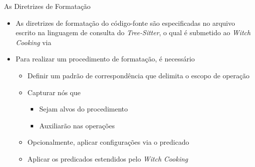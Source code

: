 \documentclass
  [ aspectratio=169,
    english,
    hyperref={citecolor=blue,colorlinks=true,linkcolor=blue,urlcolor=blue},
    brazil]
  {beamer}
\newcommand{\treesitter}{\textit{Tree-Sitter}\xspace}
\newcommand{\witchcooking}{\textit{Witch Cooking}\xspace}
\begin{document}


  \begin{frame}[fragile]{As Diretrizes de Formatação}
    \begin{itemize}
      \item As diretrizes de formatação do código-fonte são especificadas no
            arquivo escrito na linguagem de consulta do \treesitter, o qual é
            submetido ao \witchcooking via 
      \item Para realizar um procedimento de formatação, é necessário
            \begin{itemize}
              \item Definir um padrão de correspondência que delimita o escopo
                    de operação
              \item Capturar nós que
                    \begin{itemize}
                      \item Sejam alvos do procedimento
                      \item Auxiliarão nas operações
                    \end{itemize}
              \item Opcionalmente, aplicar configurações via o predicado
              \item Aplicar os predicados estendidos pelo \witchcooking
            \end{itemize}
    \end{itemize}
  \end{frame}
\end{document}
